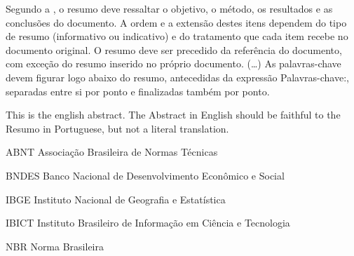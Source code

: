 \documentclass[
	12pt,				%
	openright,			%
	twoside,			%
	a4paper,			%
	tcc,			%
]{cct-uenp}
\begin{document}

\begin{resumo}
 Segundo a , o resumo deve ressaltar o
 objetivo, o método, os resultados e as conclusões do documento. A ordem e a extensão
 destes itens dependem do tipo de resumo (informativo ou indicativo) e do
 tratamento que cada item recebe no documento original. O resumo deve ser
 precedido da referência do documento, com exceção do resumo inserido no
 próprio documento. (\ldots) As palavras-chave devem figurar logo abaixo do
 resumo, antecedidas da expressão Palavras-chave:, separadas entre si por
 ponto e finalizadas também por ponto.
\end{resumo}

\begin{Abstract}
 This is the english abstract. The Abstract in English should be faithful to the
 Resumo in Portuguese, but not a literal translation.
\end{Abstract}

\listoffigures*
\cleardoublepage

\listoftables*
\cleardoublepage

\begin{siglas}
  \item[ABNT] Associação Brasileira de Normas Técnicas
  \item[BNDES] Banco Nacional de Desenvolvimento Econômico e Social
  \item[IBGE] Instituto Nacional de Geografia e Estatística
  \item[IBICT] Instituto Brasileiro de Informação em Ciência e Tecnologia
  \item[NBR] Norma Brasileira
\end{siglas}

\end{document}
